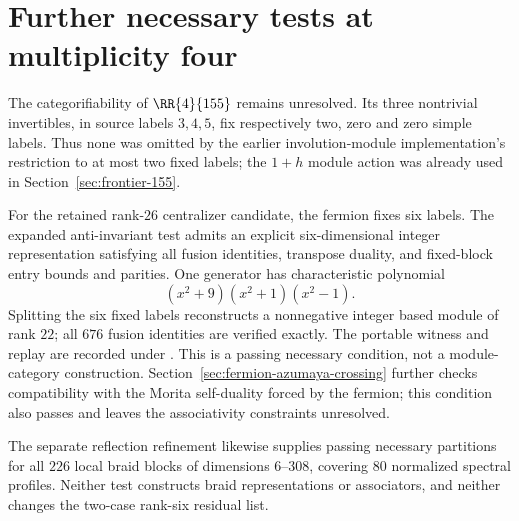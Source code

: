 \section{Further necessary tests at multiplicity four}
\label{sec:155-final-necessary-tests}
The categorifiability of $\RR{4}{155}$ remains unresolved.  Its three
nontrivial invertibles, in source labels $3,4,5$, fix respectively two,
zero and zero simple labels.  Thus none was omitted by the earlier
involution-module implementation's restriction to at most two fixed
labels; the $1+h$ module action was already used in
Section~\ref{sec:frontier-155}.

For the retained rank-$26$ centralizer candidate, the fermion fixes
six labels.  The expanded anti-invariant test admits an explicit
six-dimensional integer representation satisfying all fusion identities,
transpose duality, and fixed-block entry bounds and parities.  One
generator has characteristic polynomial
\[
 (x^2+9)(x^2+1)(x^2-1).
\]
Splitting the six fixed labels reconstructs a nonnegative integer based
module of rank $22$; all $676$ fusion identities are verified exactly.
The portable witness and replay are recorded under
.
This is a passing necessary condition, not a module-category construction.
Section~\ref{sec:fermion-azumaya-crossing} further checks compatibility
with the Morita self-duality forced by the fermion; this condition also
passes and leaves the associativity constraints unresolved.

The separate reflection refinement likewise supplies passing necessary
partitions for all $226$ local braid blocks of dimensions $6$--$308$,
covering $80$ normalized spectral profiles.  Neither test constructs
braid representations or associators, and neither changes the two-case
rank-six residual list.
